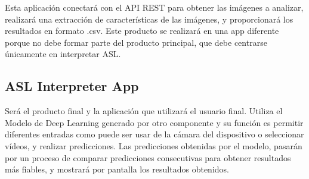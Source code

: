 \documentclass[../main.tex]{subfiles}
\begin{document}
Esta aplicación conectará con el API REST para obtener las imágenes a analizar, realizará una extracción de características de las imágenes, y proporcionará los resultados en formato .csv.
Este producto se realizará en una app diferente porque no debe formar parte del producto principal, que debe centrarse únicamente en interpretar ASL.

\subsection{ ASL Interpreter App }

Será el producto final y la aplicación que utilizará el usuario final. Utiliza el Modelo de Deep Learning generado por otro componente y su función es permitir diferentes entradas como puede ser usar de la cámara del dispositivo o seleccionar vídeos, y realizar predicciones. 
Las predicciones obtenidas por el modelo, pasarán por un proceso de comparar predicciones consecutivas para obtener resultados más fiables, y mostrará por pantalla los resultados obtenidos.
\end{document}
